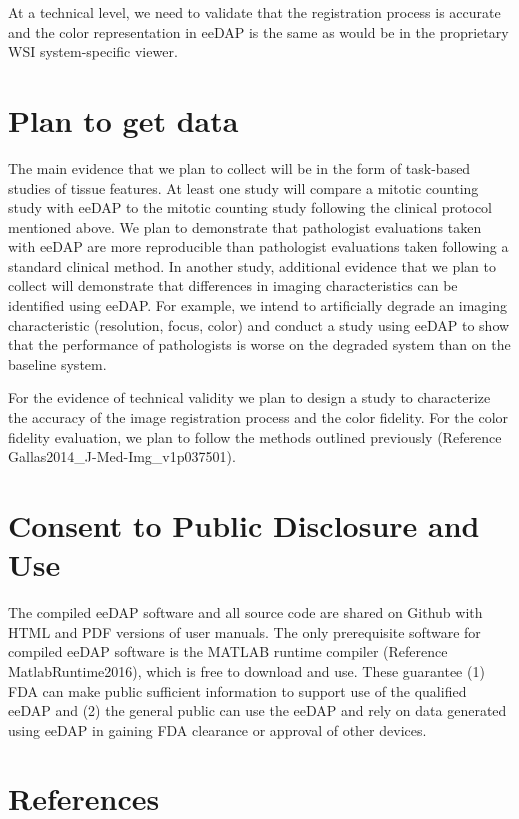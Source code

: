 \documentclass{article}%
\begin{document}
At a technical level, we need to validate that the registration process is
accurate and the color representation in eeDAP is the same as would be in the
proprietary WSI system-specific viewer.

\section{Plan to get data}

\label{plan-to-get-data}

The main evidence that we plan to collect will be in the form of task-based
studies of tissue features. At least one study will compare a mitotic counting
study with eeDAP to the mitotic counting study following the clinical protocol
mentioned above. We plan to demonstrate that pathologist evaluations taken
with eeDAP are more reproducible than pathologist evaluations taken following
a standard clinical method. In another study, additional evidence that we plan
to collect will demonstrate that differences in imaging characteristics can be
identified using eeDAP. For example, we intend to artificially degrade an
imaging characteristic (resolution, focus, color) and conduct a study using
eeDAP to show that the performance of pathologists is worse on the degraded
system than on the baseline system.

For the evidence of technical validity we plan to design a study to
characterize the accuracy of the image registration process and the color
fidelity. For the color fidelity evaluation, we plan to follow the methods
outlined previously (Reference Gallas2014\_J-Med-Img\_v1p037501).

\section{Consent to Public Disclosure and Use}

\label{consent-to-public-disclosure-and-use}

The compiled eeDAP software and all source code are shared on Github with HTML
and PDF versions of user manuals. The only prerequisite software for compiled
eeDAP software is the MATLAB runtime compiler (Reference MatlabRuntime2016),
which is free to download and use. These guarantee (1) FDA can make public
sufficient information to support use of the qualified eeDAP and (2) the
general public can use the eeDAP and rely on data generated using eeDAP in
gaining FDA clearance or approval of other devices.

\section{References}

\label{references}



\end{document}
